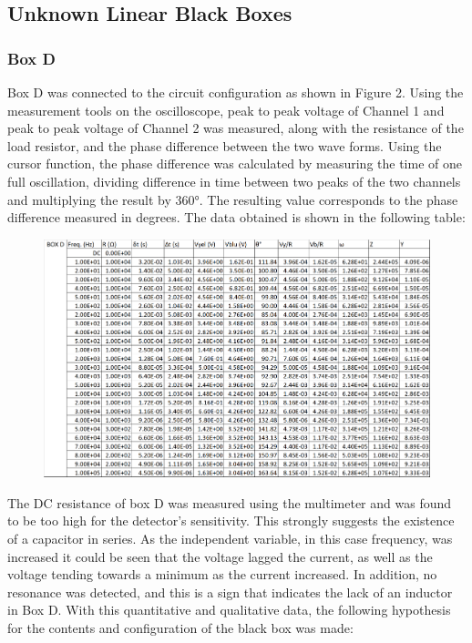 \documentclass[a4paper]{article}
\begin{document}
\subsection{Unknown Linear Black Boxes}
\subsubsection{Box D}
Box D was connected to the circuit configuration as shown in Figure 2. Using the measurement tools on the oscilloscope, peak to peak voltage of Channel 1 and peak to peak voltage of Channel 2 was measured, along with the resistance of the load resistor, and the phase difference between the two wave forms. Using the cursor function, the phase difference was calculated by measuring the time of one full oscillation, dividing difference in time between two peaks of the two channels and multiplying the result by $360°$. The resulting value corresponds to the phase difference measured in degrees. The data obtained is shown in the following table:

\begin{figure}[h]
\centering
\includegraphics[width=1.0\textwidth]{boxd}
\end{figure}

The DC resistance of box D was measured using the multimeter and was found to be too high for the detector's sensitivity. This strongly suggests the existence of a capacitor in series. As the independent variable, in this case frequency, was increased it could be seen that the voltage lagged the current, as well as the voltage tending towards a minimum as the current increased. In addition, no resonance was detected, and this is a sign that indicates the lack of an inductor in Box D. With this quantitative and qualitative data, the following hypothesis for the contents and configuration of the black box was made:
\end{document}
